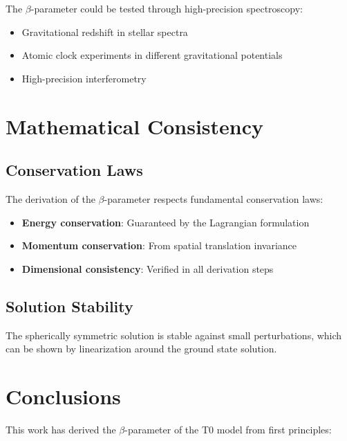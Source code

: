 \documentclass[12pt,a4paper]{article}
\begin{document}
	The $\beta$-parameter could be tested through high-precision spectroscopy:
	\begin{itemize}
		\item Gravitational redshift in stellar spectra
		\item Atomic clock experiments in different gravitational potentials
		\item High-precision interferometry
	\end{itemize}
	
	\section{Mathematical Consistency}
	\label{sec:mathematical_consistency}
	
	\subsection{Conservation Laws}
	\label{subsec:conservation_laws}
	
	The derivation of the $\beta$-parameter respects fundamental conservation laws:
	\begin{itemize}
		\item \textbf{Energy conservation}: Guaranteed by the Lagrangian formulation
		\item \textbf{Momentum conservation}: From spatial translation invariance
		\item \textbf{Dimensional consistency}: Verified in all derivation steps
	\end{itemize}
	
	\subsection{Solution Stability}
	\label{subsec:solution_stability}
	
	The spherically symmetric solution is stable against small perturbations, which can be shown by linearization around the ground state solution.
	
	\section{Conclusions}
	\label{sec:conclusions}
	
	This work has derived the $\beta$-parameter of the T0 model from first principles:
	
\end{document}
